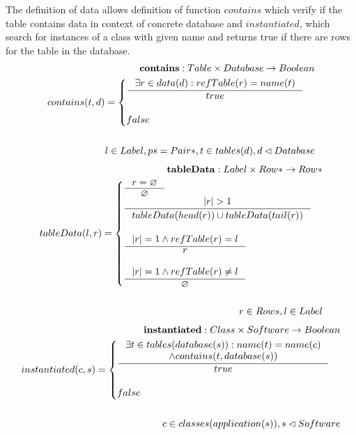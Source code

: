 \documentclass[11pt]{article}
\begin{document}
The definition of data allows definition of function $contains$ which verify if the table contains data in context of concrete database and $instantiated$, which search for instances of a class with given name and returns true if there are rows for the table in the database.
\begin{align*}
	\mathbf{contains} : Table \times Database \rightarrow Boolean \\
	contains(t, d) = \begin{cases}
			\inference{\exists r \in data(d) : refTable(r) = name(t) }{true} \\ \\
		 	false
 		\end{cases} \\ \\
 l \in Label, ps = Pair*, t \in tables(d), d \lhd Database
\end{align*}
\begin{align*}
	\mathbf{tableData} : Label \times Row* \rightarrow Row* \\
	tableData(l, r) = \begin{cases}
 		\inference{r = \varnothing}{\varnothing} \\
 		\inference{|r| > 1}{tableData(head(r)) \cup tableData(tail(r))}\\ \\
 		\inference{|r| = 1 \wedge refTable(r) = l}{r}\\\\
 		\inference{|r| = 1 \wedge refTable(r) \neq l}{\varnothing}
 \end{cases} \\ \\
	r \in Rows, l \in Label
\end{align*}
\begin{align*}
	\mathbf{instantiated} : Class \times Software \rightarrow Boolean \\
	instantiated(c, s) = \begin{cases} \inference{\exists t \in tables(database(s)) : name(t) = name(c) \\ \wedge contains(t, database(s))}{true} \\ \\
  false
 \end{cases} \\ \\
	 c \in classes(application(s)), s \lhd Software 
\end{align*}
\end{document}
